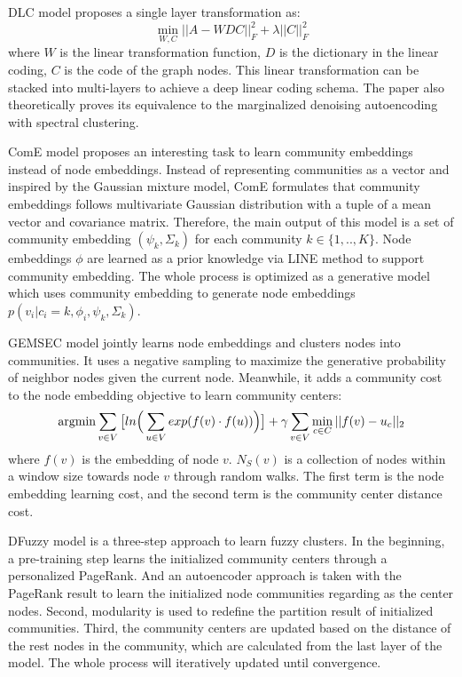 DLC model \cite{shao2015deep} proposes a single layer transformation as:
\begin{equation}
\min_{W,C} ||A-WDC||^2_F + \lambda||C||^2_F
\end{equation}
where $W$ is the linear transformation function, $D$ is the dictionary in the linear coding, $C$ is the code of the graph nodes. This linear transformation can be stacked into multi-layers to achieve a deep linear coding schema. The paper also theoretically proves its equivalence to the marginalized denoising autoencoding with spectral clustering.  

ComE model \cite{zheng2016node} proposes an interesting task to learn community embeddings instead of node embeddings. Instead of representing communities as a vector and inspired by the Gaussian mixture model, ComE formulates that community embeddings follows multivariate Gaussian distribution with a tuple of a mean vector and covariance matrix. Therefore, the main output of this model is a set of community embedding $(\psi_k,\Sigma_k)$ for each community $k \in \{1,..,K\}$. Node embeddings $\phi$ are learned as a prior knowledge via LINE method \cite{tang2015line} to support community embedding. The whole process is optimized as a generative model which uses community embedding to generate node embeddings $p(v_i|c_i=k,\phi_i,\psi_k,\Sigma_k)$.

GEMSEC model \cite{rozemberczki2019gemsec} jointly learns node embeddings and clusters nodes into communities. It uses a negative sampling to maximize the generative probability of neighbor nodes given the current node. Meanwhile, it adds a community cost to the node embedding objective to learn community centers:
\begin{equation}
\operatorname*{argmin} \sum_{v\in V}\big[ ln \Big(\sum_{u\in V}exp(f(v)\cdot f(u)) \Big) \big] + \gamma \sum_{v \in V}\min_{c\in C}||f(v)-u_c||_2
\end{equation}
where $f(v)$ is the embedding of node $v$. $N_S(v)$ is a collection of nodes within a window size towards node $v$ through random walks. The first term is the node embedding learning cost, and the second term is the community center distance cost. 

DFuzzy model \cite{bhatia2018dfuzzy} is a three-step approach to learn fuzzy clusters. In the beginning, a pre-training step learns the initialized community centers through a personalized PageRank. And an autoencoder approach is taken with the PageRank result to learn the initialized node communities regarding as the center nodes. Second, modularity is used to redefine the partition result of initialized communities. Third, the community centers are updated based on the distance of the rest nodes in the community, which are calculated from the last layer of the model. The whole process will iteratively updated until convergence.

